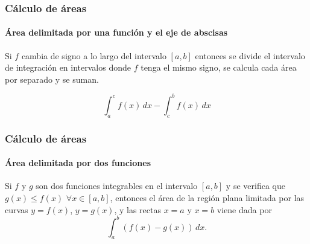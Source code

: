\begin{frame}
	\frametitle{Cálculo de áreas}
	\framesubtitle{Área delimitada por una función y el eje de abscisas}
	Si $f$ cambia de signo a lo largo del intervalo $[a,b]$ entonces se divide el intervalo de integración en intervalos donde $f$ tenga el mismo signo, se calcula cada área por separado y se suman.
	\begin{center}
		\scalebox{1}{}
	\end{center}
	\[\int_a^c f(x)\,dx -\int_c^b f(x)\,dx\]
\end{frame}


\begin{frame}
	\frametitle{Cálculo de áreas}
	\framesubtitle{Área delimitada por dos funciones}
	Si $f$ y $g$ son dos funciones integrables en el intervalo $[a,b]$ y se
	verifica que $g(x)\leq f(x)$ $\forall x\in[a,b]$, entonces el área de la región
	plana limitada por las curvas $y=f(x)$, $y=g(x)$, y las rectas $x=a$ y $x=b$
	viene dada por
	\[
		\int_{a}^{b}{(f(x)- g(x))\,dx}.
	\]
	
	\begin{center}
		\scalebox{1}{}
	\end{center}
\end{frame}